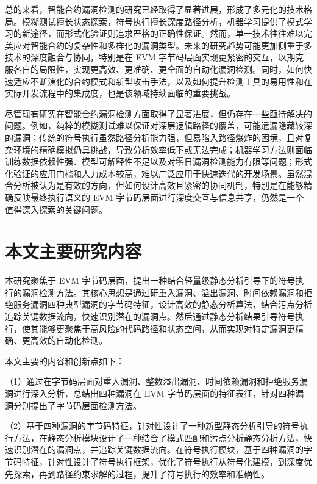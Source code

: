 \documentclass[print, master, vlined, timesmath]{DissertUESTC}
\begin{document}
总的来看，智能合约漏洞检测的研究已经取得了显著进展，形成了多元化的技术格局。模糊测试擅长状态探索，符号执行擅长深度路径分析，机器学习提供了模式学习的新途径，而形式化验证则追求严格的正确性保证。然而，单一技术往往难以完美应对智能合约的复杂性和多样化的漏洞类型。未来的研究趋势可能更加侧重于多技术的深度融合与协同，特别是在 EVM 字节码层面实现更紧密的交互，以期克服各自的局限性，实现更高效、更准确、更全面的自动化漏洞检测。同时，如何快速适应不断演化的合约模式和新型攻击手法，以及如何提升检测工具的易用性和在实际开发流程中的集成度，也是该领域持续面临的重要挑战。


尽管现有研究在智能合约漏洞检测方面取得了显著进展，但仍存在一些亟待解决的问题。例如，纯粹的模糊测试难以保证对深层逻辑路径的覆盖，可能遗漏隐藏较深的漏洞；传统的符号执行虽然路径分析能力强，但易陷入路径爆炸的困境，且对复杂环境的精确模拟仍具挑战，导致分析效率低下或无法完成；机器学习方法则面临训练数据依赖性强、模型可解释性不足以及对零日漏洞检测能力有限等问题；形式化验证的应用门槛和人力成本较高，难以广泛应用于快速迭代的开发场景。虽然混合分析被认为是有效的方向，但如何设计高效且紧密的协同机制，特别是在能够精确反映最终执行语义的 EVM 字节码层面进行深度交互与信息共享，仍然是一个值得深入探索的关键问题。




\section{本文主要研究内容}

本研究聚焦于 EVM 字节码层面，提出一种结合轻量级静态分析引导下的符号执行的漏洞检测方法。其核心思想是通过研重入漏洞、溢出漏洞、时间依赖漏洞和拒绝服务漏洞四种典型漏洞的字节码特征，设计高效的静态分析算法，结合污点分析追踪关键数据流向，快速识别潜在的漏洞点。然后通过静态分析结果引导符号执行，使其能够更聚焦于高风险的代码路径和状态空间，从而实现对特定漏洞更精确、更高效的自动化检测。

本文主要的内容和创新点如下：

（1）通过在字节码层面对重入漏洞、整数溢出漏洞、时间依赖漏洞和拒绝服务漏洞进行深入分析，总结出四种漏洞在 EVM 字节码层面的特征表征，针对四种漏洞分别提出了字节码层面检测方法。

（2）基于四种漏洞的字节码特征，针对性设计了一种新型静态分析引导的符号执行方法，在静态分析模块设计了一种结合了模式匹配和污点分析静态分析方法，快速识别潜在的漏洞点，并追踪关键数据流向。在符号执行模块，基于四种漏洞的字节码特征，针对性设计了符号执行框架，优化了符号执行从符号化建模，到深度优先探索，再到路径约束求解的过程，提升了符号执行的效率和准确性。
\end{document}
